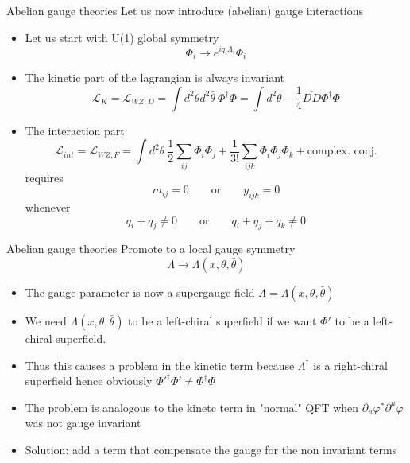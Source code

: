 \documentclass[10pt]{beamer}
\begin{document}
\begin{frame}{Abelian gauge theories}
Let us now introduce (abelian) gauge interactions
\begin{itemize} 
    \item Let us start with U(1) global symmetry 
    \begin{equation*}
        \Phi_i \rightarrow e^{iq_i\Lambda_i}\Phi_i
    \end{equation*}
    \item The kinetic part of the lagrangian is always invariant
    \begin{equation*}
        \mathcal{L}_{K} = \mathcal{L}_{WZ,D} = \int d^2\theta d^2 \bar\theta \ \Phi^{\dagger}\Phi = \int d^2\theta -\frac{1}{4} \overline{D D} \Phi^{\dagger}\Phi
    \end{equation*}
    \item The interaction part 
    \begin{equation*}
        \mathcal{L}_{int} = \mathcal{L}_{WZ,F} = \int d^2\theta \ \frac{1}{2} \sum_{ij} \Phi_i \Phi_j + \frac{1}{3!} \sum_{ijk} \Phi_i \Phi_j \Phi_k + \text{complex. conj.}
    \end{equation*}
    requires
    \begin{equation*}
        m_{ij} = 0 \qquad \text{or} \qquad y_{ijk} = 0
    \end{equation*}
    whenever
    \begin{equation*}
        q_i + q_j \neq 0 \qquad \text{or} \qquad q_i + q_j + q_k \neq 0
    \end{equation*}
\end{itemize}
\end{frame}

\begin{frame}{Abelian gauge theories}
Promote to a local gauge symmetry
\begin{equation*}
    \Lambda \to \Lambda(x, \theta, \bar\theta)
\end{equation*}
\begin{itemize}
    \item The gauge parameter is now a supergauge field $\Lambda = \Lambda(x, \theta, \bar\theta)$
    \item We need $\Lambda(x, \theta, \bar\theta)$ to be a left-chiral superfield if we want $\Phi'$ to be a left-chiral superfield. \\ 
    \item Thus this causes a problem in the kinetic term because $\Lambda^{\dagger}$ is a right-chiral superfield
    hence obviously $\Phi'^{\dagger}\Phi' \neq \Phi^{\dagger}\Phi$
    \item The problem is analogous to the kinetc term in "normal" QFT when $\partial_u \varphi^* \partial^\mu \varphi$ was not gauge invariant
    \item Solution: add a term that compensate the gauge for the non invariant terms
\end{itemize}
\end{frame}
\end{document}
